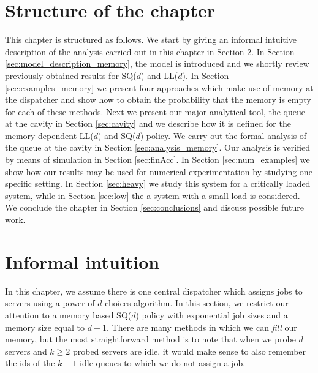 \documentclass[12pt]{report}
\begin{document}
\section{Structure of the chapter}
This chapter is structured as follows. We start by giving an informal intuitive description of the analysis carried out in this chapter in Section \ref{sec:intuition_memory}. In Section \ref{sec:model_description_memory}, the model is introduced and we shortly review previously obtained results for SQ($d$) and LL($d$). In Section \ref{sec:examples_memory} we present four approaches which make use of memory at the dispatcher and show how to obtain the probability that the memory is empty for each of these methods. Next we present our major analytical tool, the queue at the cavity in Section \ref{sec:cavity} and we describe how it is defined for the memory dependent LL($d$) and SQ($d$) policy. We carry out the formal analysis of the queue at the cavity in Section \ref{sec:analysis_memory}. Our analysis is verified by means of simulation in Section \ref{sec:finAcc}. In Section \ref{sec:num_examples} we show how our results may be used for numerical experimentation by studying one specific setting. In Section \ref{sec:heavy} we study this system for a critically loaded system, while in Section \ref{sec:low} the a system with a small load is considered. We conclude the chapter in Section \ref{sec:conclusions} and
discuss possible future work.

\section{Informal intuition} \label{sec:intuition_memory}
In this chapter, we assume there is one central dispatcher which assigns jobs to servers using a power of $d$ choices algorithm. In this section, we restrict our attention to a memory based SQ($d$) policy with exponential job sizes and a memory size equal to $d-1$. There are many methods in which we can \textit{fill} our memory, but the most straightforward method is to note that when we probe $d$ servers and $k \geq 2$ probed servers are idle, it would make sense to also remember the ids of the $k-1$ idle queues to which we do not assign a job.
\end{document}
